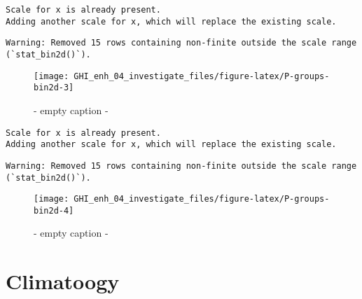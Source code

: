 \documentclass[
  10pt,
  a4paper,oneside]{article}
\begin{document}
\begin{verbatim}
Scale for x is already present.
Adding another scale for x, which will replace the existing scale.
\end{verbatim}

\begin{verbatim}
Warning: Removed 15 rows containing non-finite outside the scale range
(`stat_bin2d()`).
\end{verbatim}

\begin{figure}[H]

{\centering \texttt{[image: GHI\_enh\_04\_investigate\_files/figure-latex/P-groups-bin2d-3]} 

}

\caption{ - empty caption - }\label{fig:P-groups-bin2d-3}
\end{figure}

\begin{verbatim}
Scale for x is already present.
Adding another scale for x, which will replace the existing scale.
\end{verbatim}

\begin{verbatim}
Warning: Removed 15 rows containing non-finite outside the scale range
(`stat_bin2d()`).
\end{verbatim}

\begin{figure}[H]

{\centering \texttt{[image: GHI\_enh\_04\_investigate\_files/figure-latex/P-groups-bin2d-4]} 

}

\caption{ - empty caption - }\label{fig:P-groups-bin2d-4}
\end{figure}

\hypertarget{climatoogy}{%
\section{Climatoogy}\label{climatoogy}}
\end{document}
